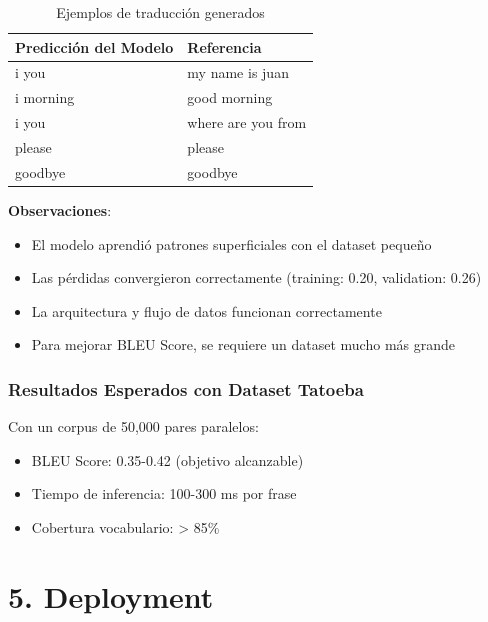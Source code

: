 \documentclass[12pt,a4paper]{article}
\begin{document}
\begin{table}[H]
    \centering
    \begin{tabular}{p{3cm}p{3cm}}
        \toprule
        \textbf{Predicción del Modelo} & \textbf{Referencia} \\
        \midrule
        i you & my name is juan \\
        i morning & good morning \\
        i you & where are you from \\
        please & please \\
        goodbye & goodbye \\
        \bottomrule
    \end{tabular}
    \caption{Ejemplos de traducción generados}
\end{table}

\textbf{Observaciones}:
\begin{itemize}
    \item El modelo aprendió patrones superficiales con el dataset pequeño
    \item Las pérdidas convergieron correctamente (training: 0.20, validation: 0.26)
    \item La arquitectura y flujo de datos funcionan correctamente
    \item Para mejorar BLEU Score, se requiere un dataset mucho más grande
\end{itemize}

\subsubsection{Resultados Esperados con Dataset Tatoeba}

Con un corpus de 50,000 pares paralelos:
\begin{itemize}
    \item BLEU Score: 0.35-0.42 (objetivo alcanzable)
    \item Tiempo de inferencia: 100-300 ms por frase
    \item Cobertura vocabulario: > 85\%
\end{itemize}

\section{5. Deployment}
\end{document}

